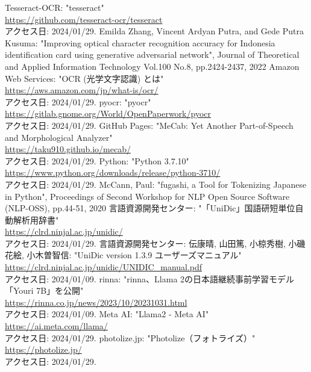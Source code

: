 \documentclass[uplatex, report, a4j, 10pt]{jsbook}
\begin{document}
\begin{thebibliography}{0}
  Tesseract-OCR: "tesseract"\\\url{https://github.com/tesseract-ocr/tesseract}\\アクセス日: 2024/01/29.
  Emilda Zhang,  Vincent Ardyan Putra, and Gede Putra Kusuma: "Improving optical character recognition accuracy for Indonesia identification card using generative adversarial network", Journal of Theoretical and Applied Information Technology Vol.100 No.8, pp.2424-2437, 2022
  Amazon Web Services: "OCR (光学文字認識) とは"\\\url{https://aws.amazon.com/jp/what-is/ocr/}\\アクセス日: 2024/01/29.
  pyocr: "pyocr"\\\url{https://gitlab.gnome.org/World/OpenPaperwork/pyocr}\\アクセス日: 2024/01/29.
  GitHub Pages: "MeCab: Yet Another Part-of-Speech and Morphological Analyzer"\\\url{https://taku910.github.io/mecab/}\\アクセス日: 2024/01/29.
  Python: "Python 3.7.10"\\\url{https://www.python.org/downloads/release/python-3710/}\\アクセス日: 2024/01/29.
  McCann, Paul: "fugashi, a Tool for Tokenizing Japanese in Python", Proceedings of Second Workshop for NLP Open Source Software (NLP-OSS), pp.44-51, 2020
  言語資源開発センター: "「UniDic」国語研短単位自動解析用辞書"\\\url{https://clrd.ninjal.ac.jp/unidic/}\\アクセス日: 2024/01/29.
  言語資源開発センター: 伝康晴, 山田篤, 小椋秀樹, 小磯花絵, 小木曽智信: "UniDic version 1.3.9 ユーザーズマニュアル"\\\url{https://clrd.ninjal.ac.jp/unidic/UNIDIC_manual.pdf}\\アクセス日: 2024/01/09.
  rinna: "rinna、Llama 2の日本語継続事前学習モデル「Youri 7B」を公開"\\\url{https://rinna.co.jp/news/2023/10/20231031.html}\\アクセス日: 2024/01/09.
  Meta AI: "Llama2 - Meta AI"\\\url{https://ai.meta.com/llama/}\\アクセス日: 2024/01/29.
  photolize.jp: "Photolize（フォトライズ）"\\\url{https://photolize.jp/}\\アクセス日: 2024/01/29.
\end{thebibliography}

\end{document}
